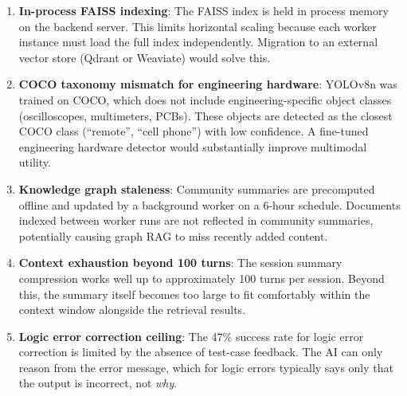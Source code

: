 \begin{enumerate}
    \item \textbf{In-process FAISS indexing}: The FAISS index is held in process memory on the backend server. This limits horizontal scaling because each worker instance must load the full index independently. Migration to an external vector store (Qdrant or Weaviate) would solve this.
    \item \textbf{COCO taxonomy mismatch for engineering hardware}: YOLOv8n was trained on COCO, which does not include engineering-specific object classes (oscilloscopes, multimeters, PCBs). These objects are detected as the closest COCO class (``remote'', ``cell phone'') with low confidence. A fine-tuned engineering hardware detector would substantially improve multimodal utility.
    \item \textbf{Knowledge graph staleness}: Community summaries are precomputed offline and updated by a background worker on a 6-hour schedule. Documents indexed between worker runs are not reflected in community summaries, potentially causing graph RAG to miss recently added content.
    \item \textbf{Context exhaustion beyond 100 turns}: The session summary compression works well up to approximately 100 turns per session. Beyond this, the summary itself becomes too large to fit comfortably within the context window alongside the retrieval results.
    \item \textbf{Logic error correction ceiling}: The 47\% success rate for logic error correction is limited by the absence of test-case feedback. The AI can only reason from the error message, which for logic errors typically says only that the output is incorrect, not \textit{why}.
\end{enumerate}
